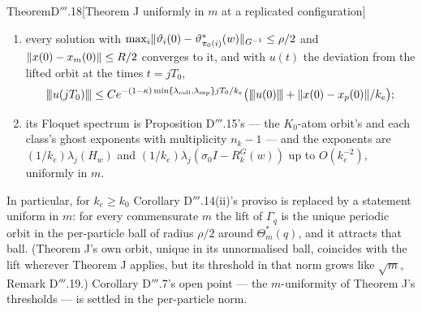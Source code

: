 \begin{thm}{Theorem}{D$'''$.18}[Theorem J uniformly in $m$ at a replicated configuration]
\begin{enumerate}[label=\textup{(\alph*)}]
    of \textup{(CL)} whose parameters satisfy
    $\sup_t\max_i\norm{\vartheta_i(t) - \vartheta^*_{\pi_0(i)}(w)}_{\Ginv}\le\rho/2$ and whose plant state stays in
    Theorem J's tube;
  \item every solution with $\max_i\lVert \vartheta_i(0) - \vartheta^*_{\pi_0(i)}(w)\rVert_{G^{-1}}\le\rho/2$ and
    $\lVert x(0) - x_m(0)\rVert\le R/2$ converges to it, and with $u(t)$ the deviation from the lifted orbit at the times
    $t = jT_0$,
    \[
      \lvert\kern-0.25ex\lvert\kern-0.25ex\lvert u(jT_0)\rvert\kern-0.25ex\rvert\kern-0.25ex\rvert\le C e^{-(1 - \kappa)\min\{\lambda_{\mathrm{coll}},\lambda_{\mathrm{sep}}\}jT_0/k_e}
      \bigl(\lvert\kern-0.25ex\lvert\kern-0.25ex\lvert u(0)\rvert\kern-0.25ex\rvert\kern-0.25ex\rvert + \lVert x(0) - x_p(0)\rVert/k_e\bigr);
    \]
  \item its Floquet spectrum is Proposition D$'''$.15's --- the $K_0$-atom orbit's and each class's ghost exponents
    with multiplicity $n_k - 1$ --- and the exponents are $(1/k_e)\lambda_j(H_w)$ and
    $(1/k_e)\lambda_j(\sigma_0I - R^G_k(w))$ up to $O(k_e^{-2})$, uniformly in $m$.
\end{enumerate}
In particular, for $k_e\ge k_0$ Corollary D$'''$.14(ii)'s proviso is replaced by a statement uniform in $m$: for
every commensurate $m$ the lift of $\Gamma_q$ is the unique periodic orbit in the per-particle ball of radius
$\rho/2$ around $\Theta^*_m(q)$, and it attracts that ball. (Theorem J's own orbit, unique in its unnormalised ball,
coincides with the lift wherever Theorem J applies, but its threshold in that norm grows like $\sqrt m$, Remark
D$'''$.19.) Corollary D$'''$.7's open point --- the $m$-uniformity of Theorem J's thresholds --- is settled in the
per-particle norm.
\end{thm}

